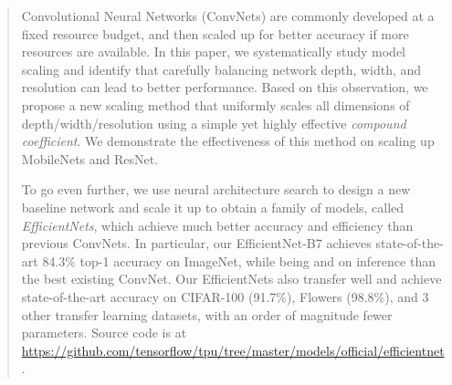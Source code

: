 \documentclass{article}
\begin{document}
\newcommand{\M}[1]{\mathcal{#1}}
\begin{abstract}

Convolutional Neural Networks (ConvNets) are commonly developed at a fixed resource budget, and then scaled up for better accuracy if more resources are available.  In this paper, we systematically study model scaling and identify that carefully balancing network depth, width, and resolution can lead to better performance. Based on this observation, we propose a new scaling method that uniformly scales all dimensions of depth/width/resolution using a simple yet highly effective \emph{compound coefficient}. We demonstrate the effectiveness of this method on scaling up MobileNets and ResNet.

To go even further, we use neural architecture search to design a new baseline network and scale it up to obtain a family of models, called \emph{EfficientNets}, which achieve much better accuracy and efficiency than previous ConvNets. In particular, our EfficientNet-B7 achieves state-of-the-art 84.3\% top-1 accuracy on ImageNet, while being  and  on inference than the best existing ConvNet. Our EfficientNets also transfer well and achieve state-of-the-art accuracy on CIFAR-100 (91.7\%), Flowers (98.8\%), and 3 other transfer learning datasets, with an order of magnitude fewer parameters. Source code is at {\footnotesize \url{https://github.com/tensorflow/tpu/tree/master/models/official/efficientnet}}.

\end{abstract}
\end{document}
